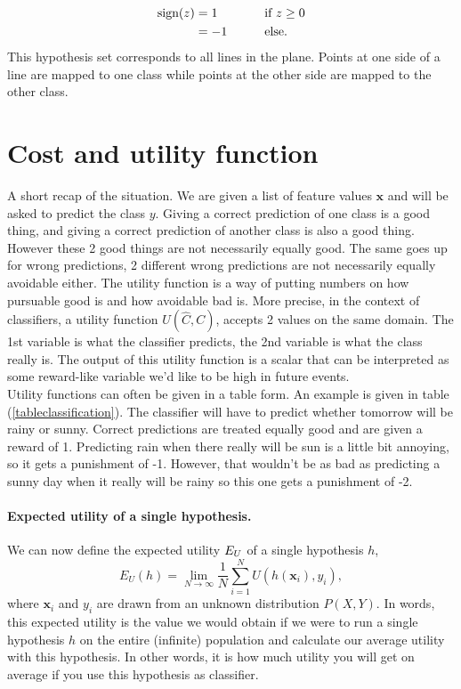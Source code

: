 \documentclass{report}
\theoremstyle{definition}
\begin{document}
\begin{alignat*}{2}
\text{sign}(z) &= 1 &&\text{\qquad if } z \geq 0\\
& = -1 &&\text{\qquad else. }
\end{alignat*}
This hypothesis set corresponds to all lines in the plane. Points at one side of a line are mapped to one class while points at the other side are mapped to the other class. 
	
	\section{Cost and utility function}
A short recap of the situation. We are given a list of feature values $\bm{x}$ and will be asked to predict the class $y$. Giving a correct prediction of one class is a good thing, and giving a correct prediction of another class is also a good thing. However these 2 good things are not necessarily equally good. The same goes up for wrong predictions, 2 different wrong predictions are not necessarily equally avoidable either. The utility function is a way of putting numbers on how pursuable good is and how avoidable bad is. More precise, in the context of classifiers, a utility function $U(\hat{C},C)$, accepts 2 values on the same domain. The 1st variable is what the classifier predicts, the 2nd variable is what the class really is. The output of this utility function is a scalar that can be interpreted as some reward-like variable we'd like to be high in future events.\\
Utility functions can often be given in a table form. An example is given in table (\ref{tableclassification}). The classifier will have to predict whether tomorrow will be rainy or sunny. Correct predictions are treated equally good and are given a reward of 1. Predicting rain when there really will be sun is a little bit annoying, so it gets a punishment of -1. However, that wouldn't be as bad as predicting a sunny day when it really will be rainy so this one gets a punishment of -2.
\paragraph{Expected utility of a single hypothesis.} We can now define the expected utility $E_{\tiny{U}}$ of a single hypothesis $h$,
\begin{equation}
E_{U}(h)=\lim_{N \to \infty} \frac{1}{N} \sum_{i=1}^{N}U(h(\bm{x}_i),y_i),
\end{equation} 
where $\bm{x}_i$ and $y_i$ are drawn from an unknown distribution $P(X,Y)$. In words, this expected utility is the value we would obtain if we were to run a single hypothesis $h$ on the entire (infinite) population and calculate our average utility with this hypothesis. In other words, it is how much utility you will get on average if you use this hypothesis as classifier.
	
\end{document}
